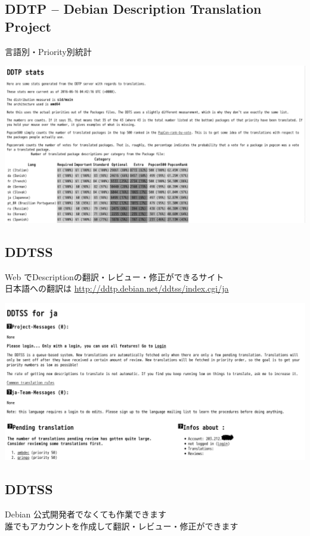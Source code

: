 \documentclass[mingoth,a4paper]{jsarticle}
\begin{document}
\subsection{DDTP -- Debian Description Translation Project}
   言語別・Priority別統計

   \begin{center}
  \includegraphics[width=\hsize]{image201606/stats-sid_mono.png}
   \end{center}

\subsection{DDTSS}
   Web でDescriptionの翻訳・レビュー・修正ができるサイト\\
   日本語への翻訳は
   \url{http://ddtp.debian.net/ddtss/index.cgi/ja}

   \begin{center}
  \includegraphics[width=0.9\hsize]{image201606/ddtss-anonymous_mono.png}
   \end{center}

\subsection{DDTSS}
    Debian 公式開発者でなくても作業できます\\
    誰でもアカウントを作成して翻訳・レビュー・修正ができます
\end{document}
